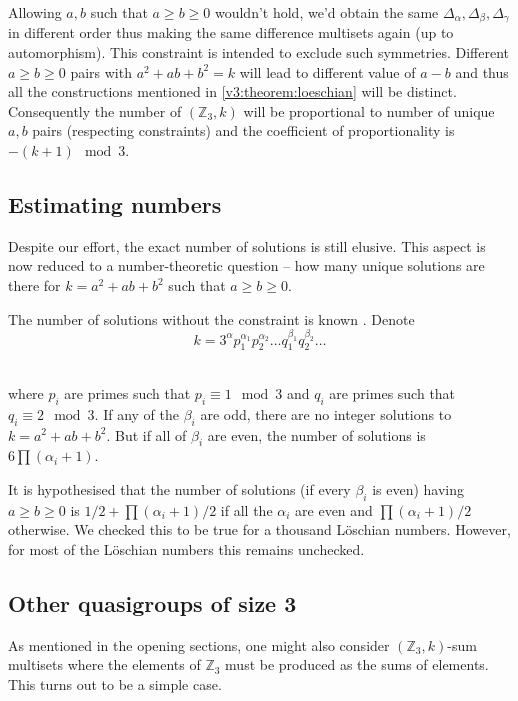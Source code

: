     \begin{remark}
        Allowing $a,b$ such that $a \geq b \geq 0$ wouldn't hold, we'd obtain the same $\Delta_\alpha, \Delta_\beta, \Delta_\gamma$ in different order thus making the same difference multisets again (up to automorphism). This constraint is intended to exclude such symmetries.
        Different $a \geq b \geq 0$ pairs with $a^2+ab+b^2=k$ will lead to different value of $a-b$ and thus all the constructions mentioned in \ref{v3:theorem:loeschian} will be distinct. Consequently the number of $(\mathbb Z_3,k)$ will be proportional to number of unique $a,b$ pairs (respecting constraints) and the coefficient of proportionality is $-(k+1) \mod 3$.
    \end{remark}

    \subsection{Estimating numbers}
        Despite our effort, the exact number of solutions is still elusive. This aspect is now reduced to a number-theoretic question -- how many unique solutions are there for $k=a^2+ab+b^2$ such that $a\geq b\geq 0$.

        The number of solutions without the constraint is known \cite{marmon2005hexagonal}. Denote
        \begin{equation}
            k=3^\alpha p_1^{\alpha_1}p_2^{\alpha_2}\ldots q_1^{\beta_1}q_2^{\beta_2}\ldots
        \end{equation}\
        
        where $p_i$ are primes such that $p_i \equiv 1 \mod 3$ and $q_i$ are primes such that $q_i \equiv 2 \mod 3$. If any of the $\beta_i$ are odd, there are no integer solutions to $k=a^2+ab+b^2$. But if all of $\beta_i$ are even, the number of solutions is $6\prod (\alpha_i +1)$.
        
        It is hypothesised \cite{nair2004elementary} that the number of solutions (if every $\beta_i$ is even) having $a \geq b \geq 0$ is $1/2 + \prod (\alpha_i +1)/2$ if all the $\alpha_i$ are even and $\prod (\alpha_i +1)/2$ otherwise. We checked this to be true for a thousand Löschian numbers. However, for most of the Löschian numbers this remains unchecked.

\subsection{Other quasigroups of size 3}
    \label{sec:v3}
    As mentioned in the opening sections, one might also consider $(\mathbb Z_3,k)$-sum multisets where the elements of $\mathbb Z_3$ must be produced as the sums of elements. This turns out to be a simple case.

